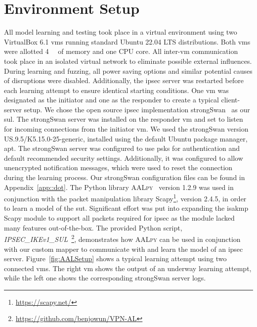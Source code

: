 \section{Environment Setup} \label{sec:env}
All model learning and testing took place in a virtual environment using two VirtualBox 6.1 \acp{vm} running standard Ubuntu 22.04 LTS distributions. Both \acp{vm} were allotted \SI{4}{\giga\byte} of memory and one CPU core. All inter-\ac{vm} communication took place in an isolated virtual network to eliminate possible external influences. During learning and fuzzing, all power saving options and similar potential causes of disruptions were disabled. Additionally, the \ac{ipsec} server was restarted before each learning attempt to ensure identical starting conditions. One \ac{vm} was designated as the initiator and one as the responder to create a typical client-server setup. We chose the open source \ac{ipsec} implementation strongSwan~\cite{software:strongSwan} as our \ac{sul}. The strongSwan server was installed on the responder \ac{vm} and set to listen for incoming connections from the initiator \ac{vm}. We used the strongSwan version US.9.5/K5.15.0-25-generic, installed using the default Ubuntu package manager, apt. The strongSwan server was configured to use \acp{psk} for authentication and default recommended security settings. Additionally, it was configured to allow unencrypted notification messages, which were used to reset the connection during the learning process. Our strongSwan configuration files can be found in Appendix~\ref{app::dot}. The Python library \textsc{AALpy}~\cite{software:aalpy} version 1.2.9 was used in conjunction with the packet manipulation library Scapy\footnote{\url{https://scapy.net/}}, version 2.4.5, in order to learn a model of the \ac{sut}. Significant effort was put into expanding the \ac{isakmp} Scapy module to support all packets required for \ac{ipsec} as the module lacked many features out-of-the-box. The provided Python script, \emph{IPSEC\_IKEv1\_SUL}~\footnote{\url{https://github.com/benjowun/VPN-AL}}, demonstrates how \textsc{AALpy} can be used in conjunction with our custom mapper to communicate with and learn the model of an \ac{ipsec} server. Figure~\ref{fig:AALSetup} shows a typical learning attempt using two connected \acp{vm}. The right \ac{vm} shows the output of an underway learning attempt, while the left one shows the corresponding strongSwan server logs.
\fi

